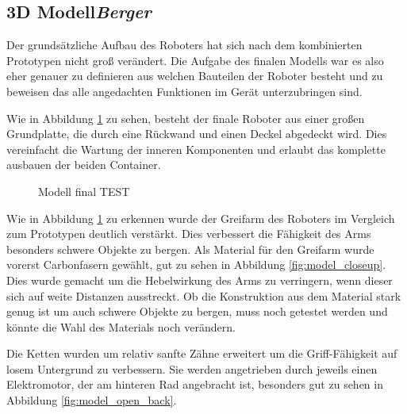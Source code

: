 \subsection{3D Modell\hfill\textnormal{\emph{Berger}}}

Der grundsätzliche Aufbau des Roboters hat sich nach dem kombinierten Prototypen nicht groß verändert.
Die Aufgabe des finalen Modells war es also eher 
genauer zu definieren aus welchen Bauteilen der Roboter besteht
und zu beweisen das alle angedachten Funktionen im Gerät unterzubringen sind.

Wie in Abbildung \ref{fig:model_open_front} zu sehen, 
besteht der finale Roboter aus einer großen Grundplatte, 
die durch eine Rückwand und einen Deckel abgedeckt wird.
Dies vereinfacht die Wartung der inneren Komponenten
und erlaubt das komplette ausbauen der beiden Container.

\begin{figure}[H]
  \caption{Modell final TEST}
  \label{fig:model_open_front}
\end{figure}

Wie in Abbildung \ref{fig:model_open_front} zu erkennen
wurde der Greifarm des Roboters im Vergleich zum Prototypen deutlich verstärkt.
Dies verbessert die Fähigkeit des Arms besonders schwere Objekte zu bergen.
Als Material für den Greifarm wurde vorerst Carbonfasern gewählt,
gut zu sehen in Abbildung \ref{fig:model_closeup}.
Dies wurde gemacht um die Hebelwirkung des Arms zu verringern,
wenn dieser sich auf weite Distanzen ausstreckt.
Ob die Konstruktion aus dem Material stark genug ist 
um auch schwere Objekte zu bergen,
muss noch getestet werden und könnte die Wahl des Materials noch verändern.

Die Ketten wurden um relativ sanfte Zähne erweitert 
um die Griff-Fähigkeit auf losem Untergrund zu verbessern.
Sie werden angetrieben durch jeweils einen Elektromotor,
der am hinteren Rad angebracht ist,
besonders gut zu sehen in Abbildung \ref{fig:model_open_back}.

